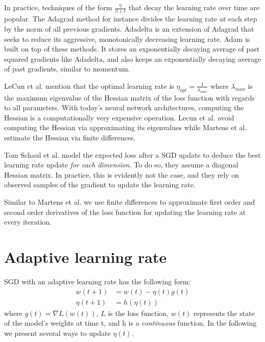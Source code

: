 \documentclass{article}
\begin{document}
  In practice, techniques of the form $\frac{\eta}{\beta+t}$ that decay the learning rate over time are popular. The Adagrad method \cite{duchi2011adaptive} for instance divides the learning rate at each step by the norm of all previous gradients. Adadelta \cite{zeiler2012adadelta} is an extension of Adagrad that seeks to reduce its aggressive, monotonically decreasing learning rate. Adam \cite{kingma2014adam} is built on top of these methods. It stores an exponentially decaying average of past squared gradients like Adadelta, and also keeps an exponentially decaying average of past gradients, similar to momentum.
  
  LeCun et al. \cite{lecun1998gradient} mention that the optimal learning rate is $\eta_{opt} = \frac{1}{\lambda_{max}}$ where $\lambda_{max}$ is the maximum eigenvalue of the Hessian matrix of the loss function with regards to all parameters. With today's neural network architectures, computing the Hessian is a computationally very expensive operation. Lecun et al. avoid computing the Hessian via approximating its eigenvalues while Martens et al. \cite{martens2010deep} estimate the Hessian via finite differences.
  
  Tom Schaul et al. \cite{schaul2013no} model the expected loss after a SGD update to deduce the best learning rate update \emph{for each dimension}. To do so, they assume a diagonal Hessian matrix. In practice, this is evidently not the case, and they rely on observed samples of the gradient to update the learning rate.
  
  Similar to Martens et al. \cite{martens2010deep} we use finite differences to approximate first order and second order derivatives of the loss function for updating the learning rate at every iteration.
  
  
  
  \section{Adaptive learning rate}
  
  SGD with an adaptive learning rate has the following form:\\
  \begin{align}
  w(t+1) &= w(t) -\eta(t)g(t)\\
  \eta(t+1) &= h(\eta(t))
  \end{align}
  where $g(t) = \nabla L(w(t))$, $L$ is the loss function, $w(t)$ represents the state of the model's weights at time t, and h is a \emph{continuous} function. In the following we present several ways to update $\eta(t)$.
  
\end{document}
